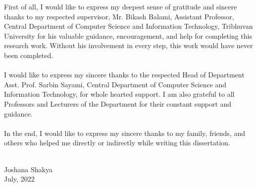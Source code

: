 First of all, I would like to express my deepest sense of gratitude and sincere thanks to my respected supervisor, Mr. Bikash Balami, Assistant Professor, Central Department of Computer Science and Information Technology, Tribhuvan University for his valuable guidance, encouragement, and help for completing this research work. Without his involvement in every step, this work would have never been completed.
\\\\
I would like to express my sincere thanks to the respected Head of Department Asst. Prof. Sarbin Sayami, Central Department of Computer Science and Information Technology, for whole hearted support. I am also grateful to all Professors and Lecturers of the Department for their constant support and guidance.
\\\\
In the end, I would like to express my sincere thanks to my family, friends, and others who helped me directly or indirectly while writing this dissertation.
\\\\
\begin{flushright}
Joshana Shakya \\
July, 2022
\end{flushright}
